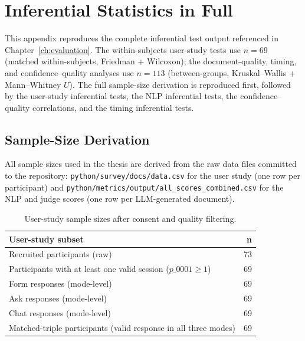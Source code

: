 \chapter{Inferential Statistics in Full}
\label{app:inferential}

This appendix reproduces the complete inferential test output
referenced in Chapter~\ref{ch:evaluation}. The within-subjects
user-study tests use $n = 69$ (matched within-subjects, Friedman +
Wilcoxon); the document-quality, timing, and confidence--quality
analyses use $n = 113$ (between-groups, Kruskal--Wallis +
Mann--Whitney $U$). The full sample-size derivation is reproduced
first, followed by the user-study inferential tests, the NLP
inferential tests, the confidence--quality correlations, and the
timing inferential tests.

\section{Sample-Size Derivation}
\label{app:samplesizes}

All sample sizes used in the thesis are derived from the raw data
files committed to the repository:
\texttt{python/survey/docs/data.csv} for the user study (one row per
participant) and \texttt{python/metrics/output/all\_scores\_combined.csv}
for the NLP and judge scores (one row per LLM-generated document).

\begin{table}[htbp]
\centering
\small
\begin{tabular}{lr}
\toprule
\textbf{User-study subset} & \textbf{n} \\
\midrule
Recruited participants (raw) & 73 \\
Participants with at least one valid session ($p\_0001 \geq 1$) & 69 \\
Form responses (mode-level) & 69 \\
Ask responses (mode-level) & 69 \\
Chat responses (mode-level) & 69 \\
Matched-triple participants (valid response in all three modes) & 69 \\
\bottomrule
\end{tabular}
\caption{User-study sample sizes after consent and quality filtering.}
\label{tab:n-survey}
\end{table}

